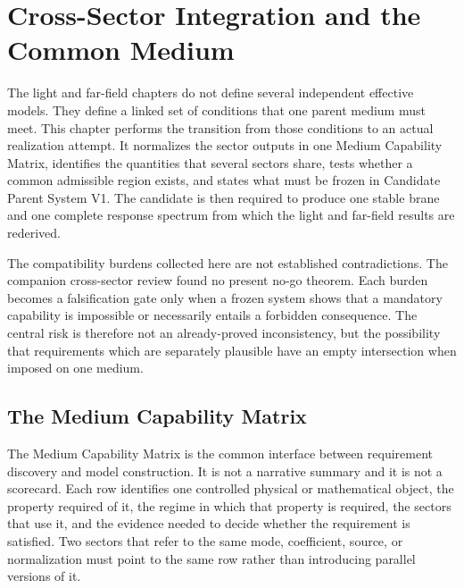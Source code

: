 
\chapter{Cross-Sector Integration and the Common Medium}
\label{ch:cross-sector-integration}

The light and far-field chapters do not define several independent effective
models. They define a linked set of conditions that one parent medium must meet.
This chapter performs the transition from those conditions to an actual
realization attempt. It normalizes the sector outputs in one Medium Capability
Matrix, identifies the quantities that several sectors share, tests whether a
common admissible region exists, and states what must be frozen in Candidate
Parent System V1. The candidate is then required to produce one stable brane and
one complete response spectrum from which the light and far-field results are
rederived.

The compatibility burdens collected here are not established contradictions.
The companion cross-sector review found no present no-go theorem. Each burden
becomes a falsification gate only when a frozen system shows that a mandatory
capability is impossible or necessarily entails a forbidden consequence. The
central risk is therefore not an already-proved inconsistency, but the
possibility that requirements which are separately plausible have an empty
intersection when imposed on one medium.

\section{The Medium Capability Matrix}

The Medium Capability Matrix is the common interface between requirement
discovery and model construction. It is not a narrative summary and it is not a
scorecard. Each row identifies one controlled physical or mathematical object,
the property required of it, the regime in which that property is required, the
sectors that use it, and the evidence needed to decide whether the requirement
is satisfied. Two sectors that refer to the same mode, coefficient, source, or
normalization must point to the same row rather than introducing parallel
versions of it.

